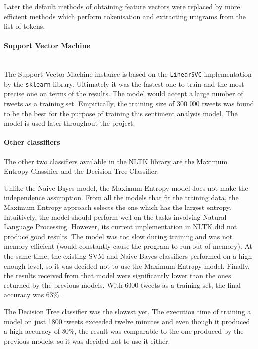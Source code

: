 Later the default methods of obtaining feature vectors were replaced by more efficient methods which perform tokenisation and extracting unigrams from the list of tokens.

\paragraph{Support Vector Machine}\mbox{}\\
The Support Vector Machine instance is based on the \texttt{LinearSVC} implementation by the \texttt{sklearn} library. 
Ultimately it was the fastest one to train and the most precise one on terms of the results. The model would accept a large number of tweets as a training set. Empirically, the training size of 300 000 tweets was found to be the best for the purpose of training this sentiment analysis model. The model is used later throughout the project.

\paragraph{Other classifiers}
The other two classifiers available in the NLTK library are the Maximum Entropy Classifier and the Decision Tree Classifier.

Unlike the Naive Bayes model, the Maximum Entropy model does not make the independence assumption. From all the models that fit the training data, the Maximum Entropy approach selects the one which has the largest entropy. Intuitively, the model should perform well on the tasks involving Natural Language Processing. However, its current implementation in NLTK did not produce good results. The model was too slow during training and was not memory-efficient (would constantly cause the program to run out of memory). At the same time, the existing SVM and Naive Bayes classifiers performed on a high enough level, so it was decided not to use the Maximum Entropy model. Finally, the results received from that model were significantly lower than the ones returned by the previous models. With 6000 tweets as a training set, the final accuracy was 63\%. 

The Decision Tree classifier was the slowest yet. The execution time of training a model on just 1800 tweets exceeded twelve minutes and even though it produced a high accuracy of 80\%, the result was comparable to the one produced by the previous models, so it was decided not to use it either.

